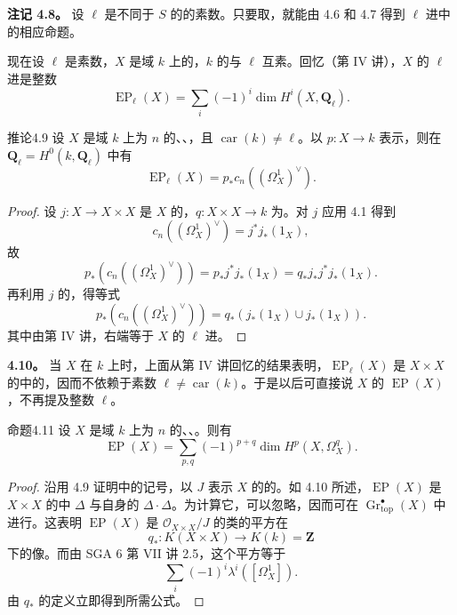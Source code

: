 \textbf{注记 4.8。} 设 $\ell$ 是不同于 $S$ 的的素数。只要取，就能由 4.6 和 4.7 得到 $\ell$ 进中的相应命题。

现在设 $\ell$ 是素数，$X$ 是域 $k$ 上的，$k$ 的与 $\ell$ 互素。回忆（第 IV 讲），$X$ 的 $\ell$ 进是整数
\[
 \operatorname{EP}_\ell(X)=\sum_i(-1)^i\dim H^i(X,\mathbf Q_\ell).
\]

\begin{SGAresult}{推论}{4.9}
设 $X$ 是域 $k$ 上为 $n$ 的、、，且 $\operatorname{car}(k)\ne\ell$。以 $p:X\to k$ 表示，则在 $\mathbf Q_\ell=H^0(k,\mathbf Q_\ell)$ 中有
\[
 \operatorname{EP}_\ell(X)=p_*c_n((\Omega_X^1)^\vee).
\]
\end{SGAresult}
\begin{proof}
设 $j:X\to X\times X$ 是 $X$ 的，$q:X\times X\to k$ 为。对 $j$ 应用 4.1 得到
\[
 c_n((\Omega_X^1)^\vee)=j^*j_*(1_X),
\]
故
\[
 p_*(c_n((\Omega_X^1)^\vee))=p_*j^*j_*(1_X)=q_*j_*j^*j_*(1_X).
\]
再利用 $j$ 的，得等式
\[
 p_*(c_n((\Omega_X^1)^\vee))=q_*(j_*(1_X)\cup j_*(1_X)).
\]
其中由第 IV 讲，右端等于 $X$ 的 $\ell$ 进。
\end{proof}

\textbf{4.10。} 当 $X$ 在 $k$ 上时，上面从第 IV 讲回忆的结果表明，$\operatorname{EP}_\ell(X)$ 是 $X\times X$ 的中的，因而不依赖于素数 $\ell\ne\operatorname{car}(k)$。于是以后可直接说 $X$ 的 $\operatorname{EP}(X)$，不再提及整数 $\ell$。

\begin{SGAresult}{命题}{4.11}
设 $X$ 是域 $k$ 上为 $n$ 的、、。则有
\[
 \operatorname{EP}(X)=\sum_{p,q}(-1)^{p+q}\dim H^p(X,\Omega_X^q).
\]
\end{SGAresult}
\begin{proof}
沿用 4.9 证明中的记号，以 $J$ 表示 $X$ 的的。如 4.10 所述，$\operatorname{EP}(X)$ 是 $X\times X$ 的中 $\Delta$ 与自身的 $\Delta\cdot\Delta$。为计算它，可以忽略，因而可在 $\operatorname{Gr}_{\mathrm{top}}^\bullet(X)$ 中进行。这表明 $\operatorname{EP}(X)$ 是 $\mathscr O_{X\times X}/J$ 的类的平方在
\[
 q_*:K(X\times X)\longrightarrow K(k)=\mathbf Z
\]
下的像。而由 SGA 6 第 VII 讲 2.5，这个平方等于
\[
 \sum_i(-1)^i\lambda^i([\Omega_X^1]).
\]
由 $q_*$ 的定义立即得到所需公式。
\end{proof}
